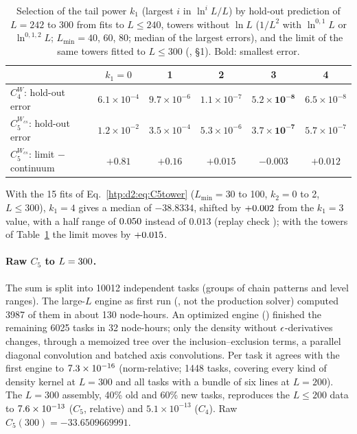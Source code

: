 \begin{table}[ht]
\centering\footnotesize\renewcommand{\arraystretch}{1.15}
\begin{tabular}{@{}lccccc@{}}
\toprule
 & $k_1=0$ & 1 & 2 & 3 & 4 \\\midrule
$C_4^W$: hold-out error & $6.1\times10^{-4}$ & $9.7\times10^{-6}$ & $1.1\times10^{-7}$ & $\mathbf{5.2\times10^{-8}}$ & $6.5\times10^{-8}$ \\
$C_5^{W_{cs}}$: hold-out error & $1.2\times10^{-2}$ & $3.5\times10^{-4}$ & $5.3\times10^{-6}$ & $\mathbf{3.7\times10^{-7}}$ & $5.7\times10^{-7}$ \\
$C_5^{W_{cs}}$: limit $-$ continuum & $+0.81$ & $+0.16$ & $+0.015$ & $-0.003$ & $+0.012$ \\
\bottomrule
\end{tabular}
\caption{Selection of the tail power $k_1$ (largest $i$ in $\ln^iL/L$) by hold-out prediction of $L=242$ to 300 from fits to
$L\le240$, towers without $\ln L$ ($1/L^2$ with $\ln^{0,1}L$ or $\ln^{0,1,2}L$; $L_{\min}=40$, 60, 80; median of the largest
errors), and the limit of the same towers fitted to $L\le300$ (,
\S1). Bold: smallest error.}
\label{htp:d2:tab:k1}
\end{table}

With the 15 fits of Eq.~\eqref{htp:d2:eq:C5tower} ($L_{\min}=30$ to 100, $k_2=0$ to 2, $L\le300$), $k_1=4$ gives a median of
$-38.8334$, shifted by $+0.002$ from the $k_1=3$ value, with a half range of $0.050$ instead of $0.013$
(replay check ); with the towers of Table~\ref{htp:d2:tab:k1} the limit moves by $+0.015$.

\paragraph{Raw $C_5$ to $L=300$.} The sum is split into 10012 independent tasks (groups of chain patterns and
level ranges). The large-$L$ engine as first run (, not the
production solver) computed 3987 of them in about 130 node-hours.
An optimized engine () finished the remaining 6025 tasks in 32 node-hours;
only the density without $\epsilon$-derivatives changes, through a memoized tree over the inclusion--exclusion terms, a parallel
diagonal convolution and batched axis convolutions. Per task it agrees with the first engine to $7.3\times10^{-16}$
(norm-relative; 1448 tasks, covering every kind of density kernel at $L=300$ and all tasks with a bundle of six lines at
$L=200$).
The $L=300$ assembly, 40\% old and 60\% new tasks, reproduces the $L\le200$ data to $7.6\times10^{-13}$ ($C_5$, relative)
and $5.1\times10^{-13}$ ($C_4$). Raw $C_5(300)=-33.6509669991$.

